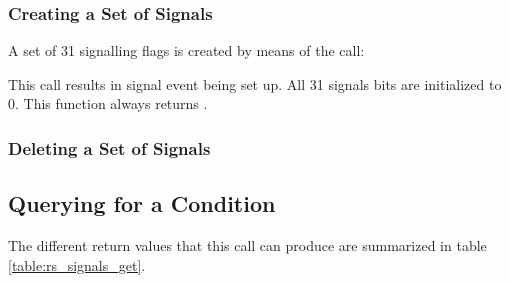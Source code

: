 \subsubsection{Creating a Set of Signals}

A set of 31 signalling flags is created by means of the call:\\


This call results in signal event being set up. All 31 signals bits are initialized to
0. This function always returns . 

\subsubsection{Deleting a Set of Signals}

\subsection{Querying for a Condition}


The different return values that this call can produce are summarized in
table \ref{table:rs_signals_get}.


